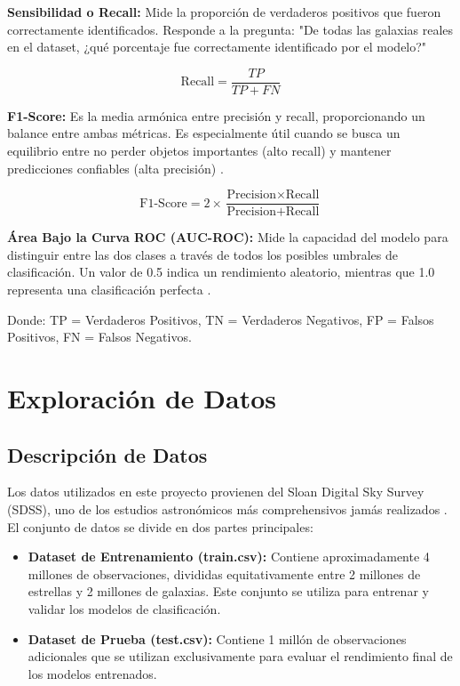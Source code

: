 \documentclass{article}
\begin{document}
\textbf{Sensibilidad o Recall:} Mide la proporción de verdaderos positivos que fueron correctamente identificados. Responde a la pregunta: "De todas las galaxias reales en el dataset, ¿qué porcentaje fue correctamente identificado por el modelo?" \cite{recall_metric}

\begin{equation}
\text{Recall} = \frac{TP}{TP + FN}
\end{equation}

\textbf{F1-Score:} Es la media armónica entre precisión y recall, proporcionando un balance entre ambas métricas. Es especialmente útil cuando se busca un equilibrio entre no perder objetos importantes (alto recall) y mantener predicciones confiables (alta precisión) \cite{fscore_metric}.

\begin{equation}
\text{F1-Score} = 2 \times \frac{\text{Precision} \times \text{Recall}}{\text{Precision} + \text{Recall}}
\end{equation}

\textbf{Área Bajo la Curva ROC (AUC-ROC):} Mide la capacidad del modelo para distinguir entre las dos clases a través de todos los posibles umbrales de clasificación. Un valor de 0.5 indica un rendimiento aleatorio, mientras que 1.0 representa una clasificación perfecta \cite{roc_metric}.

Donde: TP = Verdaderos Positivos, TN = Verdaderos Negativos, FP = Falsos Positivos, FN = Falsos Negativos.

\section{Exploración de Datos}

\subsection{Descripción de Datos}

Los datos utilizados en este proyecto provienen del Sloan Digital Sky Survey (SDSS), uno de los estudios astronómicos más comprehensivos jamás realizados \cite{kaggle_dataset}. El conjunto de datos se divide en dos partes principales:

\begin{itemize}
    \item \textbf{Dataset de Entrenamiento (train.csv):} Contiene aproximadamente 4 millones de observaciones, divididas equitativamente entre 2 millones de estrellas y 2 millones de galaxias. Este conjunto se utiliza para entrenar y validar los modelos de clasificación.
    \item \textbf{Dataset de Prueba (test.csv):} Contiene 1 millón de observaciones adicionales que se utilizan exclusivamente para evaluar el rendimiento final de los modelos entrenados.
\end{itemize}
\end{document}
